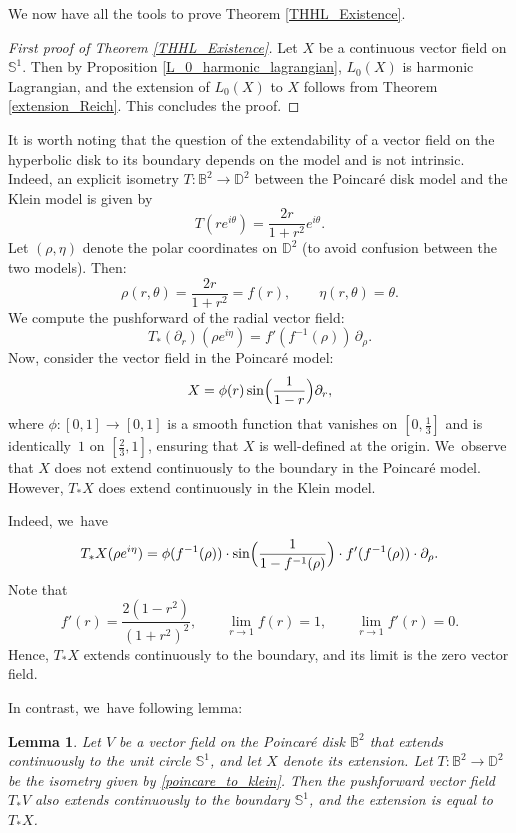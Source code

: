 \documentclass[11pt]{article}
\theoremstyle{plain}
\newtheorem{lemma}[cor]{Lemma}
\theoremstyle{definition}
\begin{document}
We now have all the tools to prove Theorem \ref{THHL_Existence}.
\begin{proof}[First proof of Theorem \ref{THHL_Existence}]
Let $X$ be a continuous vector field on $\mathbb{S}^1$. Then by Proposition \ref{L_0_harmonic_lagrangian}, $L_0(X)$ is harmonic Lagrangian, and the extension of $L_0(X)$ to $X$ follows from Theorem \ref{extension_Reich}. This concludes the proof.
\end{proof}
It is worth noting that the question of the extendability of a vector field on the hyperbolic disk to its boundary depends on the model and is not intrinsic. Indeed, an explicit isometry $T:\mathbb{B}^2 \to \mathbb{D}^2$ between the Poincaré disk model and the Klein model is given by
\begin{equation}\label{poincare_to_klein}
T(re^{i\theta}) = \frac{2r}{1 + r^2} e^{i\theta}.
\end{equation}
Let \((\rho, \eta)\) denote the polar coordinates on \(\mathbb{D}^2\) (to avoid confusion between the two models). Then:
\[
\rho(r, \theta) = \frac{2r}{1 + r^2} = f(r), \qquad \eta(r, \theta) = \theta.
\]
We compute the pushforward of the radial vector field:
\[
T_*(\partial_r)(\rho e^{i\eta}) = f'(f^{-1}(\rho))\, \partial_\rho.
\]
Now, consider the vector field in the Poincaré model:
\[
X = \phi(r) \sin\Bigl(\frac{1}{1 - r}\Bigr) \partial_r,
\]
where \(\phi : [0, 1] \to [0, 1]\) is a smooth function that vanishes on \([0, \tfrac{1}{3}]\) and is identically~\(1\) on \([\tfrac{2}{3}, 1]\), ensuring that \(X\) is well-defined at the origin. We~observe that \(X\) does not extend continuously to the boundary in the Poincaré model. However, \(T_*X\) does extend continuously in the Klein model.

Indeed, we~have
\[
T_*X(\rho e^{i\eta}) = \phi(f^{-1}(\rho)) \cdot \sin\Bigl(\frac{1}{1 - f^{-1}(\rho)}\Bigr) \cdot f'(f^{-1}(\rho)) \cdot \partial_\rho.
\]
Note that
\[
f'(r) = \frac{2(1 - r^2)}{(1 + r^2)^2}, \qquad
\lim_{r \to 1} f(r) = 1, \qquad \lim_{r \to 1} f'(r) = 0.
\]
Hence, \(T_*X\) extends continuously to the boundary, and its limit is the zero vector field.

In contrast, we~have following lemma:

\begin{lemma}\label{extension_B_to_D}
Let \(V\) be a vector field on the Poincaré disk \(\mathbb{B}^2\) that extends continuously to the unit circle \(\mathbb{S}^1\), and let \(X\) denote its extension. Let \(T:\mathbb{B}^2 \to \mathbb{D}^2\) be the isometry given by \eqref{poincare_to_klein}. Then the pushforward vector field \(T_*V\) also extends continuously to the boundary \(\mathbb{S}^1\), and the extension is equal to \(T_*X\).
\end{lemma}
\end{document}
